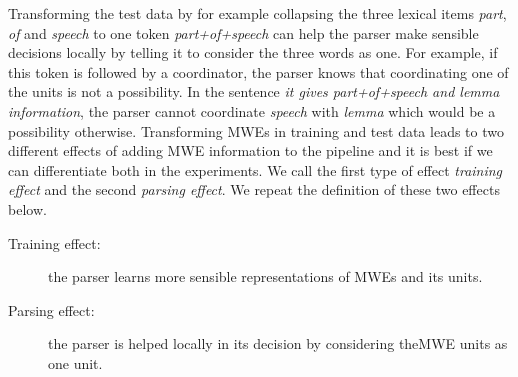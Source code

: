 \documentclass[output=paper]{langsci/langscibook}
\begin{document}
\indent Transforming the test data by for example collapsing the three lexical items \textit{part}, \textit{of} and \textit{speech} to one token \textit{part+of+speech} can help the parser make sensible decisions locally by telling it to consider the three words as one. For example, if this token is followed by a coordinator, the parser knows that coordinating one of the units is not a possibility. In the sentence \textit{it gives part+of+speech and lemma information}, the parser cannot coordinate \textit{speech} with \textit{lemma} which would be a possibility otherwise. Transforming MWEs in training and test data leads to two different effects of adding MWE information to the  pipeline and it is best if we can differentiate both in the experiments. We call the first type of effect \textit{training effect} and the second \textit{parsing effect}. We repeat the definition of these two effects below.
    \begin{description}
        \item[Training effect:] the parser learns more sensible representations of MWEs and its units. 
        \item[Parsing effect:] the parser is helped locally in its decision by considering the\linebreak MWE units as one unit.
    \end{description}
\end{document}
